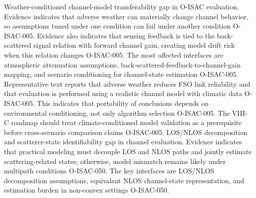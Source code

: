 {}\markdownRendererOlBegin
{} Weather-conditioned channel-model transferability gap in O-ISAC evaluation.\markdownRendererOlItemEnd 
{} Evidence indicates that adverse weather can materially change channel behavior, so assumptions tuned under one condition can fail under another condition O-ISAC-005. Evidence also indicates that sensing feedback is tied to the back-scattered signal relation with forward channel gain, creating model drift risk when this relation changes O-ISAC-005.\markdownRendererOlItemEnd 
{} The most affected interfaces are atmospheric attenuation assumptions, back-scattered-feedback-to-channel-gain mapping, and scenario conditioning for channel-state estimation O-ISAC-005.\markdownRendererOlItemEnd 
{} Representative text reports that adverse weather reduces FSO link reliability and that evaluation is performed using a realistic channel model with climatic data O-ISAC-005. This indicates that portability of conclusions depends on environmental conditioning, not only algorithm selection O-ISAC-005.\markdownRendererOlItemEnd 
{} The VIII-C roadmap should treat climate-conditioned model validation as a prerequisite before cross-scenario comparison claims O-ISAC-005.\markdownRendererOlItemEnd 
\markdownRendererOlEnd \markdownRendererInterblockSeparator
{}
\markdownRendererSectionEnd \markdownRendererSectionBegin
{}\markdownRendererInterblockSeparator
{}\markdownRendererOlBegin
{} LOS/NLOS decomposition and scatterer-state identifiability gap in channel evaluation.\markdownRendererOlItemEnd 
{} Evidence indicates that practical modeling must decouple LOS and NLOS paths and jointly estimate scattering-related states; otherwise, model mismatch remains likely under multipath conditions O-ISAC-050.\markdownRendererOlItemEnd 
{} The key interfaces are LOS/NLOS decomposition assumptions, equivalent NLOS channel-state representation, and estimation burden in non-convex settings O-ISAC-050.\markdownRendererOlItemEnd 
